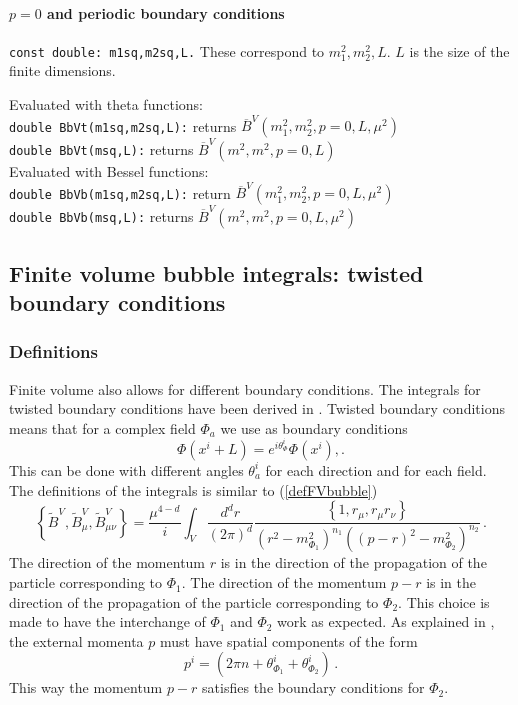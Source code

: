 \documentclass[12pt,a4paper]{article}
\newcommand{\mytt}[1]{\texttt{#1}}
\newcommand{\newfunction}[1]{\mytt{#1}\index{\mytt{#1}}}
\begin{document}
\paragraph{$p=0$ and periodic boundary conditions}

\mytt{const double: m1sq,m2sq,L.}
These correspond to $m_1^2,m_2^2,L$. $L$ is the size of the finite
dimensions.

Evaluated with theta functions:\\
\mytt{double \newfunction{BbVt}(m1sq,m2sq,L):}
returns $\overline{B}^V(m_1^2,m_2^2,p=0,L,\mu^2)$\\
\mytt{double \newfunction{BbVt}(msq,L):}
returns $\overline{B}^V(m^2,m^2,p=0,L)$\\

Evaluated with Bessel functions:\\
\mytt{double \newfunction{BbVb}(m1sq,m2sq,L):}
return $\overline{B}^V(m_1^2,m_2^2,p=0,L,\mu^2)$\\
\mytt{double \newfunction{BbVb}(msq,L):}
returns $\overline{B}^V(m^2,m^2,p=0,L,\mu^2)$\\

\subsection{Finite volume bubble integrals: twisted boundary conditions}

\subsubsection{Definitions}

Finite volume also allows for different boundary conditions.
The integrals for twisted boundary conditions have been derived
in \cite{Bijnens:2014yya}.
Twisted boundary conditions means that for a complex field $\Phi_a$ we
use as boundary conditions
\begin{equation}
\Phi(x^i+L) = e^{i\theta^i_\Phi}\Phi(x^i),.
\end{equation} 
This can be done with different angles $\theta^i_a$ for each direction
and for each field. The definitions of the integrals
is similar to (\ref{defFVbubble})
\begin{equation}
\label{defFVbubbletwist}
\left\{\tilde B^V,\tilde B^V_{\mu},\tilde B^V_{\mu\nu}\right\}
 = \frac{\mu^{4-d}}{i}\int_V\frac{d^d r}{(2\pi)^d}
\frac{\left\{1,r_\mu,r_\mu r_\nu\right\}}
{(r^2-m^2_{\Phi_1})^{n_1}((p-r)^2-m^2_{\Phi_2})^{n_2}}\,.
\end{equation}
The direction of the momentum $r$ is in the direction of the propagation
of the particle corresponding to $\Phi_1$.
The direction of the momentum $p-r$ is in the direction of the propagation
of the particle corresponding to $\Phi_2$. This choice is made to have
the interchange of $\Phi_1$ and $\Phi_2$ work as expected.
As explained in \cite{Sachrajda:2004mi}, the external momenta
$p$ must have spatial components of the form
\begin{equation}
\label{pitwist}
p^i = \left(2\pi n+\theta^i_{\Phi_1}+\theta^i_{\Phi_2}\right)\,.
\end{equation}
This way the momentum $p-r$ satisfies the boundary conditions
for $\Phi_2$.
\end{document}

